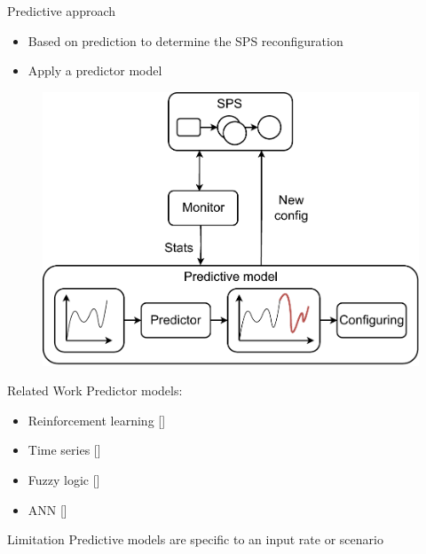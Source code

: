 \begin{frame}{Predictive approach}
	\begin{itemize}
		\item Based on prediction to determine the SPS reconfiguration
		\item Apply a predictor model
	\end{itemize}
	
	\begin{figure}
		\includegraphics[scale=0.45]{images/concepts/RW-Predictive.pdf}
	\end{figure}
\end{frame}

\begin{frame}{Related Work}
	Predictor models:
	
	\begin{itemize}
		\item Reinforcement learning [\cite{CardelliniPNR18}]
		\item Time series [\cite{KombiLLRB19}]
		\item Fuzzy logic [\cite{MencagliTD18}]
		\item ANN [\cite{LombardiABQ18}]
	\end{itemize}
	
	\pause
	
	\begin{alertblock}{Limitation}
		Predictive models are specific to an input rate or scenario
	\end{alertblock}
\end{frame}





